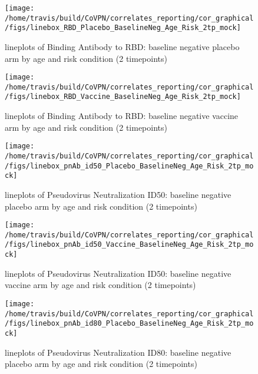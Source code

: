\documentclass[]{book}
\theoremstyle{definition}
\theoremstyle{definition}
\theoremstyle{definition}
\newcommand{\1}{\mathbbm{1}}
\begin{document}
\clearpage
\begin{figure}[H]

{\centering \texttt{[image: /home/travis/build/CoVPN/correlates\_reporting/cor\_graphical/figs/linebox\_RBD\_Placebo\_BaselineNeg\_Age\_Risk\_2tp\_mock]} 

}

\caption{lineplots of Binding Antibody to RBD: baseline negative placebo arm by age and risk condition (2 timepoints)}\label{fig:unnamed-chunk-125}
\end{figure}

\clearpage
\begin{figure}[H]

{\centering \texttt{[image: /home/travis/build/CoVPN/correlates\_reporting/cor\_graphical/figs/linebox\_RBD\_Vaccine\_BaselineNeg\_Age\_Risk\_2tp\_mock]} 

}

\caption{lineplots of Binding Antibody to RBD: baseline negative vaccine arm by age and risk condition (2 timepoints)}\label{fig:unnamed-chunk-126}
\end{figure}

\clearpage
\begin{figure}[H]

{\centering \texttt{[image: /home/travis/build/CoVPN/correlates\_reporting/cor\_graphical/figs/linebox\_pnAb\_id50\_Placebo\_BaselineNeg\_Age\_Risk\_2tp\_mock]} 

}

\caption{lineplots of Pseudovirus Neutralization ID50: baseline negative placebo arm by age and risk condition (2 timepoints)}\label{fig:unnamed-chunk-127}
\end{figure}

\clearpage
\begin{figure}[H]

{\centering \texttt{[image: /home/travis/build/CoVPN/correlates\_reporting/cor\_graphical/figs/linebox\_pnAb\_id50\_Vaccine\_BaselineNeg\_Age\_Risk\_2tp\_mock]} 

}

\caption{lineplots of Pseudovirus Neutralization ID50: baseline negative vaccine arm by age and risk condition (2 timepoints)}\label{fig:unnamed-chunk-128}
\end{figure}

\clearpage
\begin{figure}[H]

{\centering \texttt{[image: /home/travis/build/CoVPN/correlates\_reporting/cor\_graphical/figs/linebox\_pnAb\_id80\_Placebo\_BaselineNeg\_Age\_Risk\_2tp\_mock]} 

}

\caption{lineplots of Pseudovirus Neutralization ID80: baseline negative placebo arm by age and risk condition (2 timepoints)}\label{fig:unnamed-chunk-129}
\end{figure}
\end{document}
